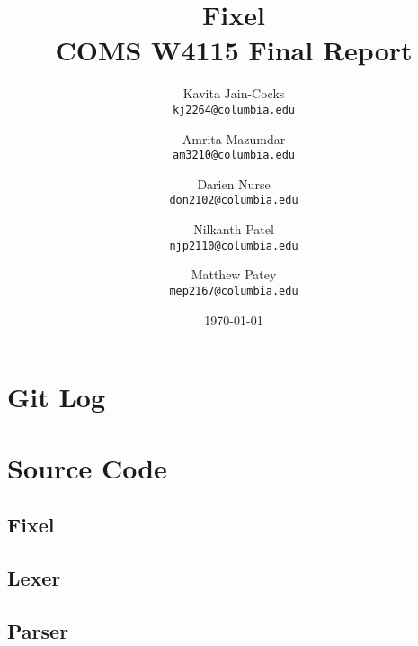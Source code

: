 \documentclass{article}
\title{Fixel \\
COMS W4115 Final Report}
\author{
  Kavita Jain-Cocks\\
  \texttt{kj2264@columbia.edu}
  \and
  Amrita Mazumdar\\
  \texttt{am3210@columbia.edu}
  \and
  Darien Nurse\\
  \texttt{don2102@columbia.edu}
  \and
  Nilkanth Patel\\
  \texttt{njp2110@columbia.edu}
  \and
  Matthew Patey\\
  \texttt{mep2167@columbia.edu}
   \\}
\date{\today}
\begin{document}
\maketitle
\newpage
\tableofcontents
\newpage




\newpage
\appendix
\section{Git Log}
\section{Source Code}
    \subsection{Fixel}
         
    \subsection{Lexer}
         
    \subsection{Parser}
        
\end{document}

